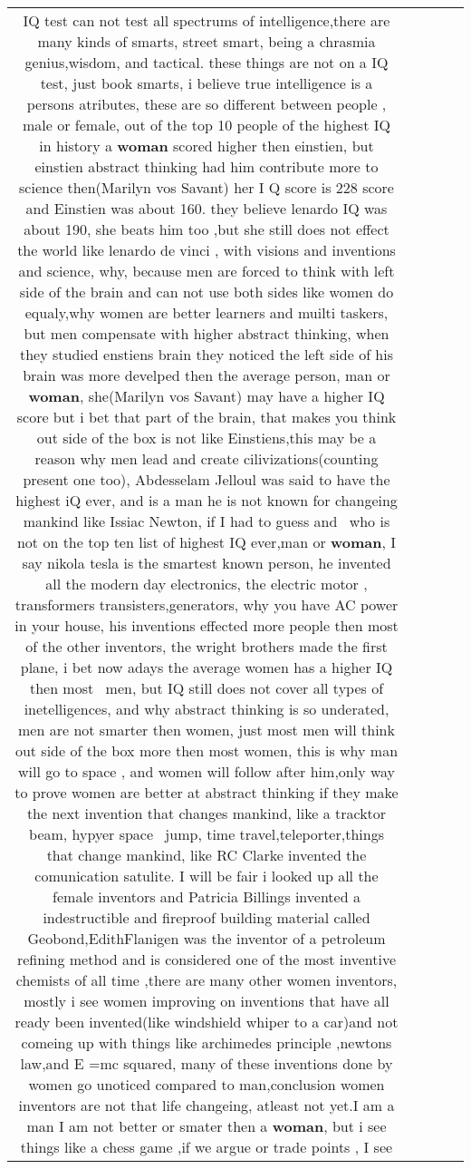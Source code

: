 \documentclass[11pt]{article}
\newlength\mylength
\begin{document}
\begin{center}
\begin{longtable}{|C{.65\mylength}|C{.30\mylength}|C{.12\mylength}|C{.12\mylength}|C{.12\mylength}|}
  \small IQ test can not test all spectrums of intelligence,there are many kinds of smarts, street smart, being a chrasmia genius,wisdom, and tactical. these things are not on a IQ test, just book smarts, i believe true intelligence is a persons atributes, these are so different between people , male or female, out of the top 10 people of the highest IQ in history a \textbf{woman} scored higher then einstien, but einstien abstract thinking had him contribute more to science then(Marilyn vos Savant) her I Q score is 228 score and Einstien was about 160. they believe lenardo IQ was about 190, she beats him too ,but she still does not effect the world like lenardo de vinci , with visions and inventions and science, why, because men are forced to think with left side of the brain and can not use both sides like women do equaly,why women are better learners and muilti taskers, but men compensate with higher abstract thinking, when they studied enstiens brain they noticed the left side of his brain was more develped then the average person, man or \textbf{woman}, she(Marilyn vos Savant) may have a higher IQ score but i bet that part of the brain, that makes you think out side of the box is not like Einstiens,this may be a reason why men lead and create cilivizations(counting present one too), Abdesselam Jelloul was said to have the highest iQ ever, and is a man he is not known for changeing mankind like Issiac Newton, if I had to guess and  who is not on the top ten list of highest IQ ever,man or \textbf{woman}, I say nikola tesla is the smartest known person, he invented all the modern day electronics, the electric motor , transformers transisters,generators, why you have AC power in your house, his inventions effected more people then most of the other inventors, the wright brothers made the first plane, i bet now adays the average women has a higher IQ then most  men, but IQ still does not cover all types of inetelligences, and why abstract thinking is so underated, men are not smarter then women, just most men will think out side of the box more then most women, this is why man will go to space , and women will follow after him,only way to prove women are better at abstract thinking if they make the next invention that changes mankind, like a tracktor beam, hypyer space  jump, time travel,teleporter,things that change mankind, like RC Clarke invented the comunication satulite. I will be fair i looked up all the female inventors and Patricia Billings invented a indestructible and fireproof building material called Geobond,EdithFlanigen was the inventor of a petroleum refining method and is considered one of the most inventive chemists of all time ,there are many other women inventors, mostly i see women improving on inventions that have all ready been invented(like windshield whiper to a car)and not comeing up with things like archimedes principle ,newtons law,and E =mc squared, many of these inventions done by women go unoticed compared to man,conclusion women inventors are not that life changeing, atleast not yet.I am a man I am not better or smater then a \textbf{woman}, but i see things like a chess game ,if we argue or trade points , I see 
\end{longtable}
\end{center}
\end{document}
